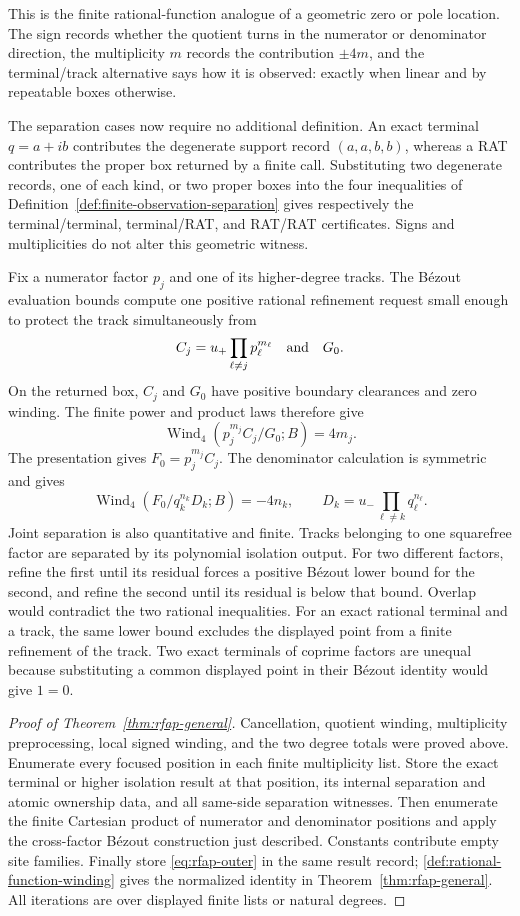 \documentclass[11pt]{article}
\newcommand{\Wind}{\operatorname{Wind}}
\newcommand{\Defref}[1]{Definition~\ref{#1}}
\newcommand{\Thmref}[1]{Theorem~\ref{#1}}
\begin{document}
This is the finite rational-function analogue of a geometric zero or pole
location.  The sign records whether the quotient turns in the numerator or
denominator direction, the multiplicity $m$ records the contribution
$\pm4m$, and the terminal/track alternative says how it is
observed: exactly when linear and by repeatable boxes otherwise.

The separation cases now require no additional definition.  An exact
terminal $q=a+ib$ contributes the degenerate support record $(a,a,b,b)$,
whereas a RAT contributes the proper box returned by a finite call.
Substituting two degenerate records, one of each kind, or two proper boxes
into the four inequalities of
\Defref{def:finite-observation-separation} gives respectively the
terminal/terminal, terminal/RAT, and RAT/RAT certificates.  Signs and
multiplicities do not alter this geometric witness.

Fix a numerator factor $p_j$ and one of its higher-degree tracks.  The
Bézout evaluation bounds compute one positive rational refinement request
small enough to protect the track simultaneously from
\[
 C_j=u_+\prod_{\ell\ne j}p_\ell^{m_\ell}
 \quad\hbox{and}\quad G_0.
\]
On the returned box, $C_j$ and $G_0$ have positive boundary clearances and
zero winding.  The finite power and product laws therefore give
\[
 \Wind_4(p_j^{m_j}C_j/G_0;B)=4m_j.
\]
The presentation gives $F_0=p_j^{m_j}C_j$.  The denominator calculation is
symmetric and gives
\[
 \Wind_4(F_0/q_k^{n_k}D_k;B)=-4n_k,
 \qquad
 D_k=u_-\prod_{\ell\ne k}q_\ell^{n_\ell}.
\]
Joint separation is also quantitative and finite.  Tracks belonging to one
squarefree factor are separated by its polynomial isolation output.  For two
different factors, refine the first until its residual forces a positive
Bézout lower bound for the second, and refine the second until its residual
is below that bound.  Overlap would contradict the two rational inequalities.
For an exact rational terminal and a track, the same lower bound excludes the
displayed point from a finite refinement of the track.  Two exact terminals
of coprime factors are unequal because substituting a common displayed point
in their Bézout identity would give $1=0$.

\begin{proof}[Proof of \Thmref{thm:rfap-general}]
Cancellation, quotient winding, multiplicity preprocessing, local signed
winding, and the two degree totals were proved above.  Enumerate every focused
position in each finite multiplicity list.  Store the exact terminal or
higher isolation result at that position, its internal separation and atomic
ownership data, and all same-side separation witnesses.  Then enumerate the
finite Cartesian product of numerator and denominator positions and apply
the cross-factor Bézout construction just described.  Constants contribute
empty site families.  Finally store \eqref{eq:rfap-outer} in the same result
record; \cref{def:rational-function-winding} gives the normalized identity in
\Thmref{thm:rfap-general}.  All iterations are over displayed finite lists or
natural degrees.
\end{proof}
\end{document}
